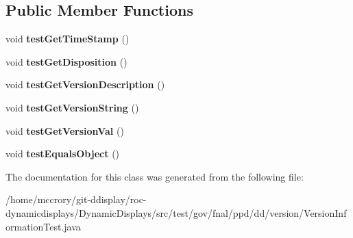\subsection*{Public Member Functions}
\begin{DoxyCompactItemize}
\item 
\hypertarget{classtest_1_1gov_1_1fnal_1_1ppd_1_1dd_1_1version_1_1VersionInformationTest_a167760db94b1ae0e4a4544f9b30bef20}{void {\bfseries test\-Get\-Time\-Stamp} ()}\label{classtest_1_1gov_1_1fnal_1_1ppd_1_1dd_1_1version_1_1VersionInformationTest_a167760db94b1ae0e4a4544f9b30bef20}

\item 
\hypertarget{classtest_1_1gov_1_1fnal_1_1ppd_1_1dd_1_1version_1_1VersionInformationTest_affab9e6c1cb6f857d3a77c6d572da796}{void {\bfseries test\-Get\-Disposition} ()}\label{classtest_1_1gov_1_1fnal_1_1ppd_1_1dd_1_1version_1_1VersionInformationTest_affab9e6c1cb6f857d3a77c6d572da796}

\item 
\hypertarget{classtest_1_1gov_1_1fnal_1_1ppd_1_1dd_1_1version_1_1VersionInformationTest_a0f52d719513f2cad23f2e2a50b4c226d}{void {\bfseries test\-Get\-Version\-Description} ()}\label{classtest_1_1gov_1_1fnal_1_1ppd_1_1dd_1_1version_1_1VersionInformationTest_a0f52d719513f2cad23f2e2a50b4c226d}

\item 
\hypertarget{classtest_1_1gov_1_1fnal_1_1ppd_1_1dd_1_1version_1_1VersionInformationTest_a8bede2f0306eae967806bfdf65a33d58}{void {\bfseries test\-Get\-Version\-String} ()}\label{classtest_1_1gov_1_1fnal_1_1ppd_1_1dd_1_1version_1_1VersionInformationTest_a8bede2f0306eae967806bfdf65a33d58}

\item 
\hypertarget{classtest_1_1gov_1_1fnal_1_1ppd_1_1dd_1_1version_1_1VersionInformationTest_a0b082e06777beea76635855e0cdd5f1d}{void {\bfseries test\-Get\-Version\-Val} ()}\label{classtest_1_1gov_1_1fnal_1_1ppd_1_1dd_1_1version_1_1VersionInformationTest_a0b082e06777beea76635855e0cdd5f1d}

\item 
\hypertarget{classtest_1_1gov_1_1fnal_1_1ppd_1_1dd_1_1version_1_1VersionInformationTest_a5d44ecd207c1620740ab7bf75d8e9f3a}{void {\bfseries test\-Equals\-Object} ()}\label{classtest_1_1gov_1_1fnal_1_1ppd_1_1dd_1_1version_1_1VersionInformationTest_a5d44ecd207c1620740ab7bf75d8e9f3a}

\end{DoxyCompactItemize}


The documentation for this class was generated from the following file\-:\begin{DoxyCompactItemize}
\item 
/home/mccrory/git-\/ddisplay/roc-\/dynamicdisplays/\-Dynamic\-Displays/src/test/gov/fnal/ppd/dd/version/Version\-Information\-Test.\-java\end{DoxyCompactItemize}
